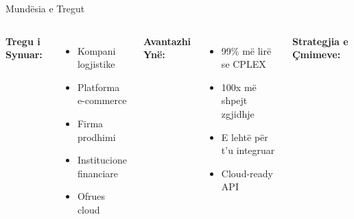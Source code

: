 \documentclass[aspectratio=169]{beamer}
\begin{document}
\begin{frame}{Mundësia e Tregut}
\begin{columns}
\textbf{Tregu i Synuar:}
\begin{itemize}
    \item Kompani logjistike
    \item Platforma e-commerce
    \item Firma prodhimi
    \item Institucione financiare
    \item Ofrues cloud
\end{itemize}

\vspace{0.3cm}
\textbf{Avantazhi Ynë:}
\begin{itemize}
    \item \textcolor{aigreen}{99\% më lirë} se CPLEX
    \item \textcolor{aigreen}{100x më shpejt} zgjidhje
    \item \textcolor{aigreen}{E lehtë} për t'u integruar
    \item \textcolor{aigreen}{Cloud-ready} API
\end{itemize}

\begin{center}
\textbf{Strategjia e Çmimeve:}

\vspace{0.3cm}
\end{center}
\end{columns}

\end{frame}
\end{document}
